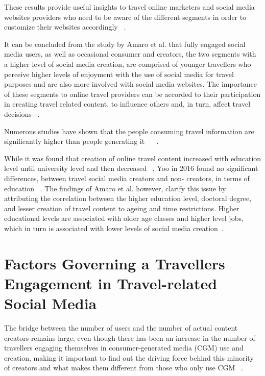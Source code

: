 These results provide useful insights to travel online marketers and social media websites providers who need to be aware of the different segments in order to customize their websites accordingly ~\cite{amaro2016travelers}.

It can be concluded from the study by Amaro et al. that fully engaged social media users, as well as occasional consumer and creators, the two segments with a higher level of social media creation, are comprised of younger travellers who perceive higher levels of enjoyment with the use of social media for travel purposes and are also more involved with social media websites. The importance of these segments to online travel providers can be accorded to their participation in creating travel related content, to influence others and, in turn, affect travel decisions ~\cite{amaro2016travelers}.

Numerous studies have shown that the people consuming travel information are significantly higher than people generating it ~\cite{pan2012theoretical} ~\cite{YOO2011609}.  

While it was found that creation of online travel content increased with education level until university level and then decreased  ~\cite{ip2012profiling}, Yoo in 2016 found no significant differences, between travel social media creators and non- creators, in terms of education ~\cite{yoo2016use}. The findings of Amaro et al. however, clarify this issue by attributing the correlation between the higher education level, doctoral degree, and lesser creation of travel content to ageing and time restrictions. Higher educational levels are associated with older age classes and higher level jobs, which in turn is associated with lower levels of social media creation~\cite{amaro2016travelers}. 

		


\section{Factors Governing a Traveller\textquotesingle s Engagement in Travel-related Social Media}\label{2}
The bridge between the number of users and the number of actual content creators remains large, even though there has been an increase in the number of travellers engaging themselves in consumer-generated media (CGM) use and creation, making it important to find out the driving force behind this minority of creators and what makes them different from those who only use CGM ~\cite{yoo2011influence}. 

